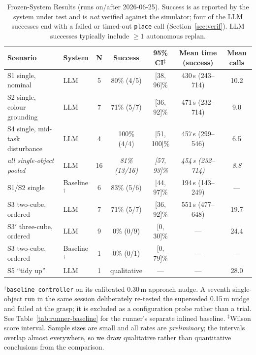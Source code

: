 \documentclass[conference]{IEEEtran}
\begin{document}
\begin{table}[t]
\caption{Frozen-System Results (runs on/after 2026-06-25). Success is as
reported by the system under test and is \emph{not} verified against the
simulator; four of the LLM successes end with a failed or timed-out
\texttt{place} call (Section~\ref{sec:verif}). LLM successes typically
include $\geq 1$ autonomous replan.}
\label{tab:results}
\centering
\begin{tabular}{@{}llccccc@{}}
\toprule
\textbf{Scenario} & \textbf{System} & \textbf{N} & \textbf{Success} &
\textbf{95\% CI$^\ddagger$} & \textbf{Mean time (success)} & \textbf{Mean calls} \\ \midrule
S1 single, nominal              & LLM & 5  & 80\% (4/5)   & [38, 96]\%  & 430\,s (243--714) & 10.2 \\
S2 single, colour grounding     & LLM & 7  & 71\% (5/7)   & [36, 92]\%  & 471\,s (232--714) & 9.0 \\
S4 single, mid-task disturbance & LLM & 4  & 100\% (4/4)  & [51, 100]\% & 457\,s (299--546) & 6.5 \\
\quad\emph{all single-object pooled} & LLM & 16 & \emph{81\% (13/16)} & \emph{[57, 93]\%} & \emph{454\,s (232--714)} & \emph{8.8} \\ \midrule
S1/S2 single                    & Baseline$^{\dagger}$ & 6 & 83\% (5/6) & [44, 97]\% & 194\,s (143--249) & --- \\ \midrule
S3 two-cube, ordered            & LLM & 7  & 71\% (5/7)   & [36, 92]\%  & 551\,s (477--648) & 19.7 \\
S3$'$ three-cube, ordered       & LLM & 9  & 0\% (0/9)    & [0, 30]\%   & ---               & 24.4 \\
S3 two-cube, ordered            & Baseline$^{\dagger}$ & 1 & 0\% (0/1) & [0, 79]\% & --- & --- \\ \midrule
S5 ``tidy up''                  & LLM & 1  & qualitative  & ---         & ---               & 28.0 \\ \bottomrule
\end{tabular}
\vspace{2pt}
\begin{flushleft}
\footnotesize
$^{\dagger}$\texttt{baseline\_controller} on its calibrated 0.30\,m approach
nudge. A seventh single-object run in the same session deliberately
re-tested the superseded 0.15\,m nudge and failed at the grasp; it is
excluded as a configuration probe rather than a trial. See
Table~\ref{tab:runner-baseline} for the runner's separate inlined baseline.
$^{\ddagger}$Wilson score interval. Sample sizes are small and all rates are
\emph{preliminary}; the intervals overlap almost everywhere, so we draw
qualitative rather than quantitative conclusions from the comparison.
\end{flushleft}
\end{table}
\end{document}
